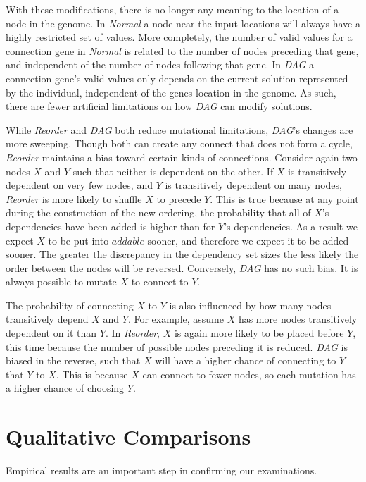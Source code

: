 \documentclass[journal]{IEEEtran}
\begin{document}
With these modifications, there is no longer any meaning to the location of a node
in the genome.  In \emph{Normal} a node near the input locations will always
have a highly restricted set of values.  More completely, the number of valid
values for a connection gene in \emph{Normal} is related to the number of nodes
preceding that gene, and independent of the number of nodes following that gene.
In \emph{DAG} a connection gene's valid values only depends on the current solution
represented by the individual, independent of the genes location in the genome.
As such, there are fewer artificial limitations on how \emph{DAG} can modify
solutions.

While \emph{Reorder} and \emph{DAG} both reduce mutational limitations, \emph{DAG}'s changes are more sweeping.
Though both can create any connect that does not form a cycle,
\emph{Reorder} maintains a bias toward certain kinds of connections.
Consider again two nodes $X$ and $Y$
such that neither is dependent on the other.  If $X$ is transitively dependent on very
few nodes, and $Y$ is transitively dependent on many nodes, \emph{Reorder} is more likely
to shuffle $X$ to precede $Y$.  This is true because at any point during the construction
of the new ordering, the probability
that all of $X$'s dependencies have been added is
higher than for $Y$'s dependencies.  As a result we expect $X$ to be put into $addable$ sooner,
and therefore we expect it to be added sooner.  The greater the discrepancy in the dependency
set sizes the less likely the order between the nodes will be reversed.
Conversely, \emph{DAG} has no such bias.  It is always possible to mutate $X$ to connect to $Y$.

The probability of connecting $X$ to $Y$ is also influenced by how many nodes transitively depend $X$ and $Y$.
For example, assume $X$ has more nodes transitively dependent on it than $Y$.
In \emph{Reorder}, $X$ is again more likely to be placed before $Y$, this time because the number
of possible nodes preceding it is reduced.  \emph{DAG} is biased in the reverse, such that $X$ will
have a higher chance of connecting to $Y$ that $Y$ to $X$.  This is because $X$ can connect to fewer
nodes, so each mutation has a higher chance of choosing $Y$.

\section{Qualitative Comparisons}
\label{sec:quality}
Empirical results are an important step in confirming our examinations.
\end{document}
